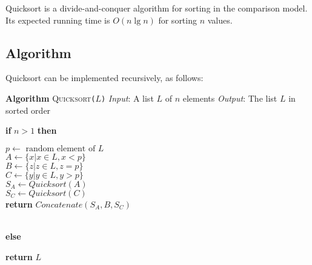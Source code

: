 \documentclass[12pt]{article}
\begin{document}
\newcommand{\Lindent}{0.4in}
\newenvironment{Lalgorithm}[4]{
\textbf{Algorithm} \textsc{#1}\texttt{(#2)}\newline
\textit{Input}: #3\newline
\textit{Output}: #4\newline
}{}
\newenvironment{Lfloatalgorithm}[6][h]{
\begin{figure}[#1]
\caption{#2}
\begin{Lalgorithm}{#3}{#4}{#5}{#6}
}{
\end{Lalgorithm}
\end{figure}
}
\newcommand{\Lgets}{\ensuremath{\gets}}
\newcommand{\Lgroup}[1]{\textbf{begin}\\\hspace*{\Lindent}\parbox{\textwidth}{#1}\\\textbf{end}}
\newcommand{\Lif}[2]{\textbf{if} #1 \textbf{then}\\\hspace*{\Lindent}\parbox{\textwidth}{#2}}
\newcommand{\Lelse}[1]{\textbf{else}\\\hspace*{\Lindent}\parbox{\textwidth}{#1}}
\newcommand{\Lelseif}[2]{\textbf{else if} #1 \textbf{then}\\\hspace*{\Lindent}\parbox{\textwidth}{#2}}
\newcommand{\Lfor}[2]{\textbf{for} #1 \textbf{do}\\\hspace*{\Lindent}\parbox{\textwidth}{#2}}


Quicksort is a divide-and-conquer algorithm for sorting in the
comparison model.    Its expected running time is $O(n\lg n)$ for
sorting $n$ values. 


\subsection*{Algorithm}

Quicksort can be implemented recursively, as follows:



\begin{Lalgorithm}{Quicksort}{$L$}{A list $L$ of $n$ elements}{The list $L$ in sorted order}
\Lif{$n > 1$}{
   $p \gets \mbox{ random element of } L$\\
   $A \gets \{x | x \in L, x < p\}$\\
   $B \gets \{z | z \in L, z = p\}$\\
   $C \gets \{y | y \in L, y > p\}$\\
   $S_A \gets Quicksort(A)$\\
   $S_C \gets Quicksort(C)$\\
   {\bf return} $Concatenate(S_A,B,S_C)$
}\\
\Lelse{{\bf return} $L$}
\end{Lalgorithm}
\end{document}
